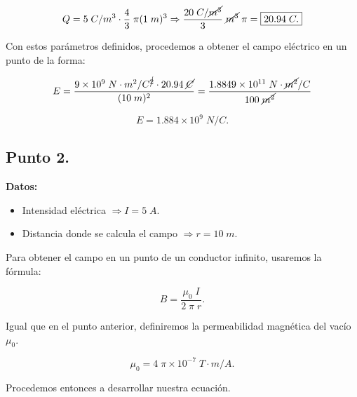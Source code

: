 \documentclass[a4paper,12pt]{article} %
\begin{document}
\[Q = 5 \; C/m^3 \cdot \frac{4}{3} \; \pi (1 \; m)^3 \Rightarrow \frac{20 \; C/ \cancel{m^3}}{3} \; \cancel{m^3} \; \pi = \boxed{20.94 \; C.}\]

\begin{justify}
    Con estos parámetros definidos, procedemos a obtener el campo eléctrico en un punto de la forma:
\end{justify}

\[E = \frac{9 \times 10^9 \; N \cdot m^2/ C^{\cancel{2}} \cdot 20.94 \; \cancel{C}}{(10 \; m)^2} = \frac{1.8849 \times 10^{11} \; N \cdot \cancel{m^2} / C}{100 \; \cancel{m^2}}\]

\vspace{\baselineskip}

\[\boxed{E = 1.884 \times 10^9 \; N/C.}\]

\subsection*{Punto 2.}

\vspace{\baselineskip}

\textbf{Datos:}

\begin{itemize}
    \item Intensidad eléctrica \(\Rightarrow I =  5 \; A\).
    \item Distancia donde se calcula el campo \(\Rightarrow r = 10 \; m.\)
\end{itemize}

\vspace{\baselineskip}

\begin{justify}
    Para obtener el campo en un punto de un conductor infinito, usaremos la fórmula:
\end{justify}

\[B = \frac{\mu_0 \; I}{2 \; \pi \; r}.\]

\vspace{\baselineskip}

\begin{justify}
    Igual que en el punto anterior, definiremos la permeabilidad magnética del vacío \(\mu_0\).
\end{justify}

\[\mu_0 = 4 \; \pi \times 10^{-7} \; T \cdot m / A.\]


\begin{justify}
    Procedemos entonces a desarrollar nuestra ecuación.
\end{justify}
\end{document}
